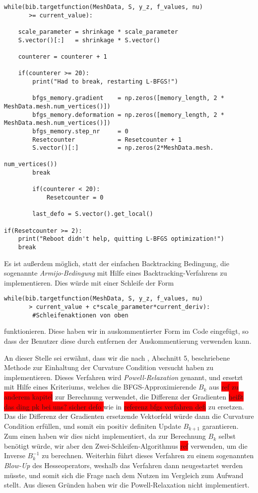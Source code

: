 \begin{lstlisting}
while(bib.targetfunction(MeshData, S, y_z, f_values, nu)
       >= current_value):
	
	scale_parameter = shrinkage * scale_parameter
    S.vector()[:]   = shrinkage * S.vector()

    counterer = counterer + 1

	if(counterer >= 20):
    	print("Had to break, restarting L-BFGS!")

        bfgs_memory.gradient    = np.zeros([memory_length, 2 * 																     MeshData.mesh.num_vertices()])
        bfgs_memory.deformation = np.zeros([memory_length, 2 * 																   MeshData.mesh.num_vertices()])
        bfgs_memory.step_nr     = 0
        Resetcounter            = Resetcounter + 1
        S.vector()[:]           = np.zeros(2*MeshData.mesh.
        											           num_vertices())
        break

        if(counterer < 20):
            Resetcounter = 0

        last_defo = S.vector().get_local()

if(Resetcounter >= 2):
    print("Reboot didn't help, quitting L-BFGS optimization!")
    break
\end{lstlisting}

Es ist außerdem möglich, statt der einfachen Backtracking Bedingung, die sogenannte \textit{Armijo-Bedingung} mit Hilfe eines Backtracking-Verfahrens zu implementieren.
Dies würde mit einer Schleife der Form
\begin{lstlisting}
while(bib.targetfunction(MeshData, S, y_z, f_values, nu)
       > current_value + c*scale_parameter*current_deriv):
		#Schleifenaktionen von oben
\end{lstlisting}
funktionieren. Diese haben wir in auskommentierter Form im Code eingefügt, so dass der Benutzer diese durch entfernen der Auskommentierung verwenden kann.

An dieser Stelle sei erwähnt, dass wir die nach \cite{Powell}, Abschnitt 5, beschriebene Methode zur Einhaltung der Curvature Condition versucht haben zu implementieren. Dieses Verfahren wird \textit{Powell-Relaxation} genannt, und ersetzt mit Hilfe eines Kriteriums, welches die BFGS-Approximierende $B_k$ aus \colorbox{red}{ref zu anderem kapitel} zur Berechnung verwendet, die Differenz der Gradienten  \colorbox{red}{heißt das ding pk bei uns? sicher defo
} wie in \colorbox{red}{referenz bfgs verfahren defi} zu ersetzen. Das die Differenz der Gradienten ersetzende Vektorfeld würde dann die Curvature Condition erfüllen, und somit ein positiv definiten Update $B_{k+1}$ garantieren. Zum einen haben wir dies nicht implementiert, da zur Berechnung $B_k$ selbst benötigt würde, wir aber den Zwei-Schleifen-Algorithmus \colorbox{red}{ref} verwenden, um die Inverse $B_k^{-1}$ zu berechnen. Weiterhin führt dieses Verfahren zu einem sogenannten \textit{Blow-Up} des Hesseoperators, weshalb das Verfahren dann neugestartet werden müsste, und somit sich die Frage nach dem Nutzen im Vergleich zum Aufwand stellt. Aus diesen Gründen haben wir die Powell-Relaxation nicht implementiert.

